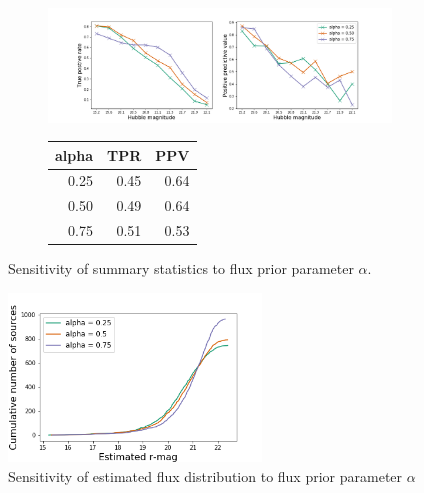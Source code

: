\begin{figure}[ht]
\begin{subfigure}{\textwidth}
\centering
\includegraphics[width = \textwidth]{figures/prior_alpha_sensitivty.png}
\end{subfigure}
\begin{subfigure}{\textwidth}
\begin{center}
\begin{tabular}{rrr}
\toprule
 alpha &   TPR &   PPV \\
\midrule
  0.25 &  0.45 &  0.64 \\
  0.50 &  0.49 &  0.64 \\
  0.75 &  0.51 &  0.53 \\
\bottomrule
\end{tabular}
\par\vspace{0pt}
\end{center}
\end{subfigure}\hfill
\caption{Sensitivity of summary statistics to flux prior parameter $\alpha$. }
\label{fig:alpha_sensitivity}
\end{figure}

\begin{figure}
    \centering
    \includegraphics[width = 0.6\textwidth]{figures/sensitivity_cdf_fluxes.png}
    \caption{Sensitivity of estimated flux distribution to flux prior parameter $\alpha$}
    \label{fig:cdf_sensitivity}
\end{figure}